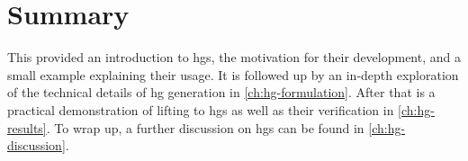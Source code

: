 \section{Summary}
This  provided an introduction to \acp{hg}, the motivation for their development, and a small example explaining their usage.
It is followed up by an in-depth exploration of the technical details of \ac{hg} generation in \cref{ch:hg-formulation}.
After that is a practical demonstration of lifting to \acp{hg} as well as their verification in \cref{ch:hg-results}.
To wrap up, a further discussion on \acp{hg} can be found in \cref{ch:hg-discussion}.
